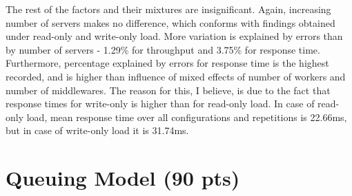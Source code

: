 \documentclass[11pt,a4paper]{article}
\begin{document}
The rest of the factors and their mixtures are insignificant. Again, increasing number of servers makes no difference, which conforms with findings obtained under read-only and write-only load. More variation is explained by errors than by number of servers - 1.29\% for throughput and 3.75\% for response time. Furthermore, percentage explained by errors for response time is the highest recorded, and is higher than influence of mixed effects of number of workers and number of middlewares. The reason for this, I believe, is due to the fact that response times for write-only is higher than for read-only load. In case of read-only load, mean response time over all configurations and repetitions is  22.66ms, but in case of write-only load it is 31.74ms.




\section{Queuing Model (90 pts)}
\end{document}
